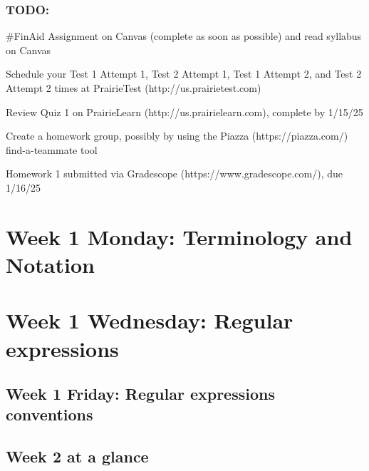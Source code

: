 \subsubsection*{TODO:}
\begin{list}{\itemsep-10pt}
   \item \#FinAid Assignment on Canvas (complete as soon as possible) and read syllabus on Canvas
   \item Schedule your Test 1 Attempt 1, Test 2 Attempt 1, Test 1 Attempt 2, and Test 2 Attempt 2 times 
   at PrairieTest (http://us.prairietest.com)
   \item Review Quiz 1 on PrairieLearn (http://us.prairielearn.com), complete by 1/15/25
   \item Create a homework group, possibly by using the Piazza (https://piazza.com/) find-a-teammate tool
   \item Homework 1 submitted via Gradescope (https://www.gradescope.com/), due 1/16/25
\end{list}

\newpage

\section*{Week 1 Monday: Terminology and Notation}


    
\newpage

\section*{Week 1 Wednesday: Regular expressions}


    
\newpage

\subsection*{Week 1 Friday: Regular expressions conventions}





\newpage

\subsection*{Week 2 at a glance}

\vspace{-15pt}

